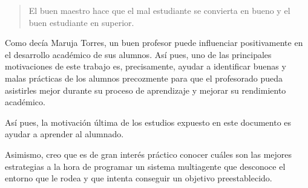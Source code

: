 \begin{quote}
\small El buen maestro hace que el mal estudiante se convierta en bueno y el buen estudiante en superior.

\end{quote}

Como decía Maruja Torres, un buen profesor puede influenciar positivamente en el desarrollo académico de sus alumnos. Así pues, uno de las principales motivaciones de este trabajo es, precisamente, ayudar a identificar buenas y malas prácticas de los alumnos precozmente para que el profesorado pueda asistirles mejor durante su proceso de aprendizaje y mejorar su rendimiento académico.

Así pues, la motivación última de los estudios expuesto en este documento es ayudar a aprender al alumnado.

Asimismo, creo que es de gran interés práctico conocer cuáles son las mejores estrategias a la hora de programar un sistema multiagente que desconoce el entorno que le rodea y que intenta conseguir un objetivo preestablecido.